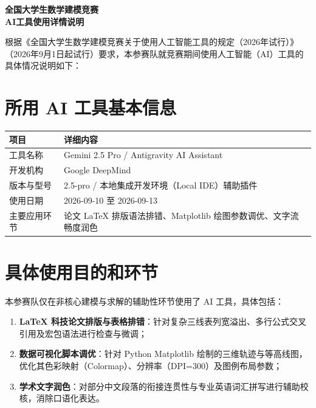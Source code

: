 \documentclass[zihao=-4,a4paper,UTF8,fontset=fandol]{ctexart}
\begin{document}
\thispagestyle{plain}

\begin{center}
    {\heiti{}\bfseries 全国大学生数学建模竞赛} \\[0.2em]
    {\heiti{}\bfseries AI工具使用详情说明}
\end{center}

\vspace{0.2em}

\noindent 根据《全国大学生数学建模竞赛关于使用人工智能工具的规定（2026年试行）》（2026年9月1日起试行）要求，本参赛队就竞赛期间使用人工智能（AI）工具的具体情况说明如下：

\section{所用 AI 工具基本信息}
\noindent
\begin{tabularx}{\textwidth}{@{}p{}Y@{}}
\toprule
\textbf{项目} & \textbf{详细内容} \\
\midrule
工具名称 & Gemini 2.5 Pro / Antigravity AI Assistant \\
开发机构 & Google DeepMind \\
版本与型号 & 2.5-pro / 本地集成开发环境（Local IDE）辅助插件 \\
使用日期 & 2026-09-10 至 2026-09-13 \\
主要应用环节 & 论文 \LaTeX{} 排版语法排错、Matplotlib 绘图参数调优、文字流畅度润色 \\
\bottomrule
\end{tabularx}

\section{具体使用目的和环节}
本参赛队仅在非核心建模与求解的辅助性环节使用了 AI 工具，具体包括：
\begin{enumerate}[label=\arabic*),leftmargin=2em,itemsep=0pt,topsep=0.1em]
    \item \textbf{\LaTeX{} 科技论文排版与表格排错}：针对复杂三线表列宽溢出、多行公式交叉引用及宏包语法进行检查与微调；
    \item \textbf{数据可视化脚本调优}：针对 Python Matplotlib 绘制的三维轨迹与等高线图，优化其色彩映射（Colormap）、分辨率（DPI=300）及图例布局参数；
    \item \textbf{学术文字润色}：对部分中文段落的衔接连贯性与专业英语词汇拼写进行辅助校核，消除口语化表达。
\end{enumerate}
\end{document}
